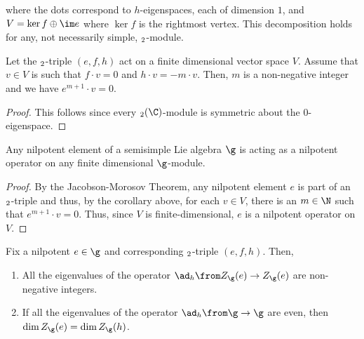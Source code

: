 \documentclass[springer-theory-notes.tex]{subfiles}
\begin{document}
where the dots correspond to \(h\)-eigenspaces, each of dimension
\(1\), and \(V = \ker f \oplus \im e\) where \(\ker f\) is the
rightmost vertex. This decomposition holds for any, not necessarily
simple, \(\sl_2\)-module.
\begin{cor}
  Let the \(\sl_2\)-triple \((e,f,h)\) act on a finite dimensional
  vector space \(V\). Assume that \(v \in V\) is such that \(f \cdot v
  = 0\) and \(h \cdot v = -m \cdot v\). Then, \(m\) is a non-negative
  integer and we have \(e^{m+1} \cdot v = 0\).
\end{cor}
\begin{proof}
  This follows since every \(\sl_2(\C)\)-module is symmetric about the
  \(0\)-eigenspace. 
\end{proof}
\begin{cor}
  Any nilpotent element of a semisimple Lie algebra \(\g\) is acting
  as a nilpotent operator on any finite dimensional \(\g\)-module.
\end{cor}
\begin{proof}
  By the Jacobson-Morosov Theorem, any nilpotent element \(e\) is part of an
  \(\sl_2\)-triple and thus, by the corollary above, for each \(v \in
  V\), there is an \(m
  \in \N\) such that \(e^{m+1} \cdot v
  = 0\). Thus, since \(V\) is finite-dimensional, \(e\) is a nilpotent
  operator on \(V\).
\end{proof}
\begin{cor}
  Fix a nilpotent \(e \in \g\) and corresponding \(\sl_2\)-triple
  \((e,f,h)\). Then,
  \begin{enumerate}
  \item All the eigenvalues of the operator \(\ad_h \from Z_\g(e) \to
    Z_\g(e)\) are non-negative integers.
  \item If all the eigenvalues of the operator \(\ad_h \from \g \to
    \g\) are even, then \(\dim Z_\g(e) = \dim Z_\g(h)\).
  \end{enumerate}
\end{cor}
\end{document}
